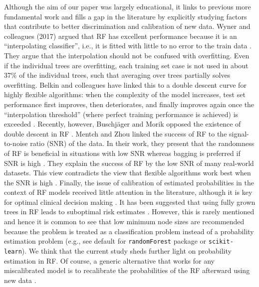 Although the aim of our paper was largely educational, it links to previous more
fundamental work and fills a gap in the literature by explicitly studying
factors that contribute to better discrimination and calibration of new data.
Wyner and colleagues (2017) argued that \gls{RF} has excellent performance because it
is an ``interpolating classifier'', i.e., it is fitted with little to no error
to the train data \cite{wynerExplainingSuccessAdaBoost2017a}. They argue that
the interpolation should not be confused with overfitting. Even if the
individual trees are overfitting, each training set case is not used in about
37\% of the individual trees, such that averaging over trees partially solves
overfitting. Belkin and colleagues have linked this to a double descent curve
for highly flexible algorithms: when the complexity of the model increases, test
set performance first improves, then deteriorates, and finally improves again
once the ``interpolation threshold'' (where perfect training performance is
achieved) is exceeded \cite{belkinFitFearRemarkable2021}. Recently, however,
Buschjäger and Morik opposed the existence of double descent in \gls{RF}
 \cite{buschjagerThereNoDoubleDescent2021}. Mentch and Zhou linked the success of
\gls{RF} to the signal-to-noise ratio (\gls{SNR}) of the data. In their work, they present
that the randomness of \gls{RF} is beneficial in situations with low \gls{SNR} whereas
bagging is preferred if \gls{SNR} is high
 \cite{mentchRandomizationRegularizationDegrees2020}. They explain the success of
\gls{RF} by the low \gls{SNR} of many real-world datasets. This view contradicts the view
that flexible algorithms work best when the \gls{SNR} is high
 \cite{vancalsterMachineLearningMedicine2019}. Finally, the issue of calibration
of estimated probabilities in the context of \gls{RF} models received little attention
in the literature, although it is key for optimal clinical decision making
 \cite{vancalsterCalibrationRiskPrediction2015}. It has been suggested that using
fully grown trees in \gls{RF} leads to suboptimal risk estimates
 \cite{malleyProbabilityMachinesConsistent2012,kruppaConsumerCreditRisk2013}.
However, this is rarely mentioned and hence it is common to see that low minimum
node sizes are recommended because the problem is treated as a classification
problem instead of a probability estimation problem (e.g., see default for
\texttt{randomForest} package or \texttt{scikit-learn}). We think that the current study sheds
further light on probability estimation in \gls{RF}. Of course, a generic alternative
that works for any miscalibrated model is to recalibrate the probabilities of
the \gls{RF} afterward using new data
 \cite{ojedaCalibratingMachineLearning2023}.

